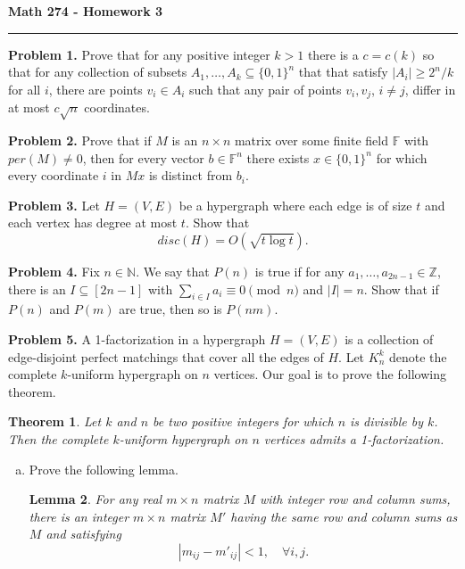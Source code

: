 \documentclass[11pt,letterpaper]{report}
\newcommand{\naturals}{\mathbb{N}}
\newcommand{\integers}{\mathbb{Z}}
\newcommand{\field}{\mathbb{F}}
\theoremstyle{plain}
\newtheorem{theorem}{Theorem}[section]
\newtheorem{lemma}[theorem]{Lemma}
\begin{document}
\begin{center}
{\bf \Large Math 274 - Homework 3}
\vspace{0.2cm}
\hrule
\end{center}

\noindent\textbf{Problem 1. }
Prove that for any positive integer $k>1$ there is a $c = c(k)$ so that for any collection of subsets $A_1, \ldots, A_k\subseteq \{0, 1\}^n$ that that satisfy $|A_i| \geq 2^n/k$ for all $i$, there are points $v_i\in A_i$ such that any pair of points $v_i, v_j$, $i\neq j$, differ in at most $c\sqrt{n}$ coordinates.










\noindent\textbf{Problem 2. }
Prove that if $M$ is an $n\times n$ matrix over some finite field $\field$ with $per(M)\neq 0$, then for every vector $b\in \field^n$ there exists $x\in \{0, 1\}^n$ for which every coordinate $i$ in $Mx$ is distinct from $b_i$.










\noindent\textbf{Problem 3. }
Let $H = (V, E)$ be a hypergraph where each edge is of size $t$ and each vertex has degree at most $t$.
Show that
\[
    disc(H) = O(\sqrt{t\log t}).
\]










\noindent\textbf{Problem 4. }
Fix $n\in \naturals$.
We say that $P(n)$ is true if for any $a_1, \ldots, a_{2n-1}\in \integers$, there is an $I\subseteq [2n-1]$ with $\sum_{i\in I}a_i \equiv 0 \pmod{n}$ and $|I| = n$.
Show that if $P(n)$ and $P(m)$ are true, then so is $P(nm)$.










\noindent\textbf{Problem 5. }
A 1-factorization in a hypergraph $H = (V,E)$ is a collection of edge-disjoint perfect matchings that cover all the edges of $H$.
Let $K_n^k$ denote the complete $k$-uniform hypergraph on $n$ vertices.
Our goal is to prove the following theorem.
\begin{theorem}
    Let $k$ and $n$ be two positive integers for which $n$ is divisible by $k$.
    Then the complete $k$-uniform hypergraph on $n$ vertices admits a 1-factorization.
\end{theorem}

\begin{enumerate}[(a)]
    \item Prove the following lemma.
    \begin{lemma}
        For any real $m\times n$ matrix $M$ with integer row and column sums, there is an integer $m\times n$ matrix $M'$ having the same row and column sums as $M$ and satisfying
        \[
            |m_{ij}-m'_{ij}|<1,\quad \forall i,j.
        \]
    \end{lemma}
\end{enumerate}
\end{document}

